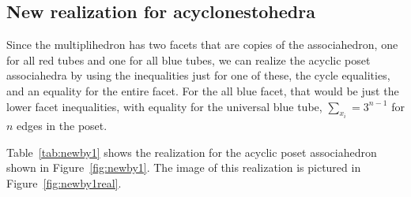 \documentclass{article}
\begin{document}

       

 
   
\subsection{New realization for acyclonestohedra}

Since the multiplihedron has two facets that are copies of the associahedron, one for all red tubes and one for all blue tubes, we can realize the acyclic poset associahedra by using the inequalities just for one of these, the cycle equalities, and an equality for the entire facet. For the all blue facet, that would be just the lower facet inequalities, with equality for the universal blue tube, $\sum_{x_i} = 3^{n-1}$ for $n$ edges in the poset.

Table~\ref{tab:newby1} shows the realization for the acyclic poset associahedron shown in Figure~\ref{fig:newby1}. The image of this realization is pictured in Figure~\ref{fig:newby1real}.
\end{document}
